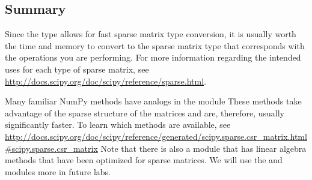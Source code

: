 \subsection*{Summary} %

Since the  type allows for fast sparse matrix type conversion, it is usually worth the time and memory to convert to the sparse matrix type that corresponds with the operations you are performing.
For more information regarding the intended uses for each type of sparse matrix, see \url{http://docs.scipy.org/doc/scipy/reference/sparse.html}.

Many familiar NumPy methods have analogs in the  module
These methods take advantage of the sparse structure of the matrices and are, therefore, usually significantly faster.
To learn which methods are available, see \url{http://docs.scipy.org/doc/scipy/reference/generated/scipy.sparse.csr_matrix.html#scipy.sparse.csr_matrix}
Note that there is also a  module that has linear algebra methods that have been optimized for sparse matrices.
We will use the  and  modules more in future labs.

